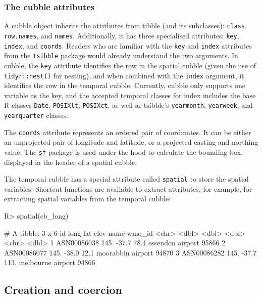 \documentclass[
  shortnames]{jss}
\begin{document}
\hypertarget{the-cubble-attributes}{%
\subsubsection{The cubble attributes}\label{the-cubble-attributes}}

A cubble object inherits the attributes from tibble (and its subclasses): \texttt{class}, \texttt{row.names}, and \texttt{names}. Additionally, it has three specialised attributes: \texttt{key}, \texttt{index}, and \texttt{coords}. Readers who are familiar with the \texttt{key} and \texttt{index} attributes from the \texttt{tsibble} package would already understand the two arguments. In cubble, the \texttt{key} attribute identifies the row in the spatial cubble (given the use of \texttt{tidyr::nest()} for nesting), and when combined with the \texttt{index} argument, it identifies the row in the temporal cubble. Currently, cubble only supports one variable as the key, and the accepted temporal classes for index includes the base R classes \texttt{Date}, \texttt{POSIXlt}, \texttt{POSIXct}, as well as tsibble's \texttt{yearmonth}, \texttt{yearweek}, and \texttt{yearquarter} classes.

The \texttt{coords} attribute represents an ordered pair of coordinates. It can be either an unprojected pair of longitude and latitude, or a projected easting and northing value. The \texttt{sf} package is used under the hood to calculate the bounding box, displayed in the header of a spatial cubble.

The temporal cubble has a special attribute called \texttt{spatial} to store the spatial variables. Shortcut functions are available to extract attributes, for example,  for extracting spatial variables from the temporal cubble:

\begin{CodeChunk}
\begin{CodeInput}
R> spatial(cb_long)
\end{CodeInput}
\begin{CodeOutput}
# A tibble: 3 x 6
  id           long   lat  elev name              wmo_id
  <chr>       <dbl> <dbl> <dbl> <chr>              <dbl>
1 ASN00086038  145. -37.7  78.4 essendon airport   95866
2 ASN00086077  145. -38.0  12.1 moorabbin airport  94870
3 ASN00086282  145. -37.7 113.  melbourne airport  94866
\end{CodeOutput}
\end{CodeChunk}

\hypertarget{create}{%
\subsection{Creation and coercion}\label{create}}
\end{document}
